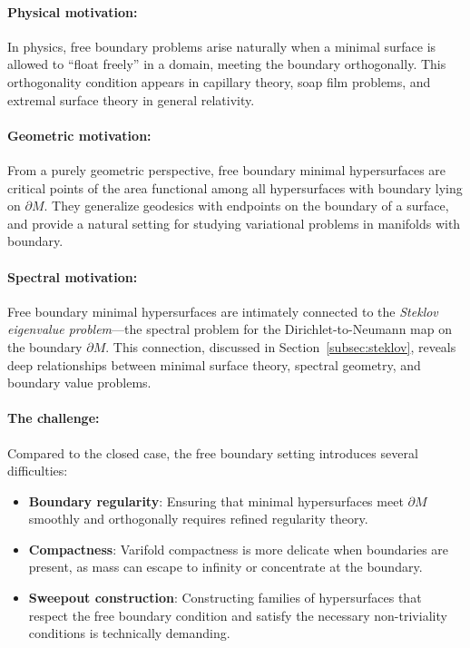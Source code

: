 \paragraph{Physical motivation:}
In physics, free boundary problems arise naturally when a minimal surface is allowed to ``float
freely'' in a domain, meeting the boundary orthogonally. This orthogonality condition appears in
capillary theory, soap film problems, and extremal surface theory in general relativity.

\paragraph{Geometric motivation:}
From a purely geometric perspective, free boundary minimal hypersurfaces are critical points of the
area functional among all hypersurfaces with boundary lying on $\partial M$. They generalize
geodesics with endpoints on the boundary of a surface, and provide a natural setting for studying
variational problems in manifolds with boundary.

\paragraph{Spectral motivation:}
Free boundary minimal hypersurfaces are intimately connected to the \emph{Steklov eigenvalue
problem}---the spectral problem for the Dirichlet-to-Neumann map on the boundary $\partial M$. This
connection, discussed in Section~\ref{subsec:steklov}, reveals deep relationships between minimal
surface theory, spectral geometry, and boundary value problems.

\paragraph{The challenge:}
Compared to the closed case, the free boundary setting introduces several difficulties:
\begin{itemize}
    \item \textbf{Boundary regularity}: Ensuring that minimal hypersurfaces meet $\partial M$
    smoothly and orthogonally requires refined regularity theory.

    \item \textbf{Compactness}: Varifold compactness is more delicate when boundaries are present,
    as mass can escape to infinity or concentrate at the boundary.

    \item \textbf{Sweepout construction}: Constructing families of hypersurfaces that respect the
    free boundary condition and satisfy the necessary non-triviality conditions is technically
    demanding.
\end{itemize}

